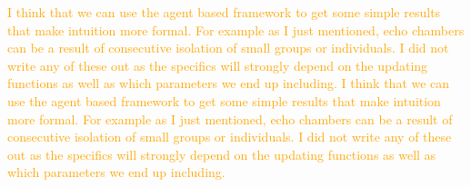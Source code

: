 \textcolor{orange}{
	I think that we can use the agent based framework to get some simple results that make intuition more formal. For example as I just mentioned, echo chambers can be a result of consecutive isolation of small groups or individuals. I did not write any of these out as the specifics will strongly depend on the updating functions as well as which parameters we end up including.
}
	\textcolor{orange}{ I think that we can use the agent based framework
		to get some simple results that make intuition more formal. For
		example as I just mentioned, echo chambers can be a result of
		consecutive isolation of small groups or individuals. I did not
		write any of these out as the specifics will strongly depend on
		the updating functions as well as which parameters we end up
		including. }

